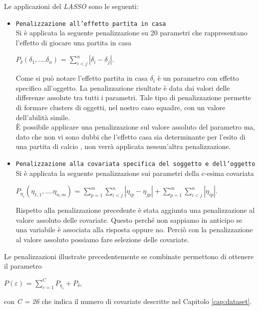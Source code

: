 Le applicazioni del \emph{LASSO} sono le seguenti:
\begin{itemize}
	\item \texttt{Penalizzazione all'effetto partita in casa}\\
	Si è applicata la seguente penalizzazione su 20 parametri che rappresentano l'effetto di giocare una partita in casa
	\begin{center}
		$ P_{\delta}(\delta_1,....\delta_n)$ = $\sum^{n}_{i<j}|\delta_i - \delta_j|$.
	\end{center}
	Come si può notare l'effetto partita in casa $\delta_i$ è un parametro con effetto specifico all'oggetto. La penalizzazione risultate è data dai valori delle differenze assolute tra tutti i parametri. Tale tipo di penalizzazione permette di formare clusters di oggetti, nel nostro caso squadre, con un valore dell'abilità simile.\\
	È possibile applicare una penalizzazione sul valore assoluto del parametro ma, dato che non vi sono dubbi che l'effetto casa sia determinante per l'esito di una partita di calcio \autocite{lago2016home}, non verrà applicata nessun’altra penalizzazione.
	\item \texttt{Penalizzazione alla covariata specifica del soggetto e dell'oggetto}\\
	Si è applicata la seguente penalizzazione sui parametri della c-esima covariata 
	\begin{center}
		$ P_{\eta_{c}}(\eta_{1,1},....\eta_{n,m})$ = $\sum^{m}_{p=1}\sum^{n}_{i<j}|\eta_{ip} - \eta_{jp}| + \sum^{m}_{p=1}\sum^{n}_{i<j}|\eta_{ip}|$.
	\end{center}
	Rispetto alla penalizzazione precedente è stata aggiunta una penalizzazione al valore assoluto delle covariate. Questo perché non sappiamo in anticipo se una variabile è associata alla risposta oppure no. Perciò con la penalizzazione al valore assoluto possiamo fare selezione delle covariate.\\
\end{itemize}

Le penalizzazioni illustrate precedentemente se combinate permettono di ottenere il parametro 
\begin{center}
	$ P(\varepsilon)$ = $\sum_{c=1}^{C}P_{\eta_c} + P_{\delta}$,
	
\end{center}
con \emph{C = 26} che indica il numero di covariate descritte nel Capitolo \ref{cap:dataset}.



